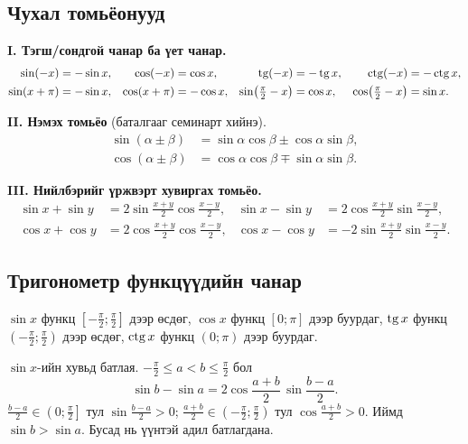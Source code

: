 \subsection{Чухал томьёонууд}
\textbf{I. Тэгш/сондгой чанар ба үет чанар.}
\begin{align*}
\sin(-x)&=-\sin x, & \cos(-x)&=\cos x, & \operatorname{tg}(-x)&=-\operatorname{tg} x, & \operatorname{ctg}(-x)&=-\operatorname{ctg} x,\\
\sin(x+\pi)&=-\sin x, & \cos(x+\pi)&=-\cos x, &
\sin\!\left(\tfrac{\pi}{2}-x\right)&=\cos x, & \cos\!\left(\tfrac{\pi}{2}-x\right)&=\sin x.
\end{align*}

\textbf{II. Нэмэх томьёо} (баталгааг семинарт хийнэ).
\begin{align*}
\sin(\alpha\pm\beta)&=\sin\alpha\cos\beta\pm\cos\alpha\sin\beta,\\
\cos(\alpha\pm\beta)&=\cos\alpha\cos\beta\mp\sin\alpha\sin\beta.
\end{align*}

\textbf{III. Нийлбэрийг үржвэрт хувиргах томьёо.}
\begin{align*}
\sin x+\sin y&=2\sin\frac{x+y}{2}\cos\frac{x-y}{2}, &
\sin x-\sin y&=2\cos\frac{x+y}{2}\sin\frac{x-y}{2},\\
\cos x+\cos y&=2\cos\frac{x+y}{2}\cos\frac{x-y}{2}, &
\cos x-\cos y&=-2\sin\frac{x+y}{2}\sin\frac{x-y}{2}.
\end{align*}

\subsection{Тригонометр функцүүдийн чанар}
\begin{theorem}
$\sin x$ функц $\left[-\frac{\pi}{2};\frac{\pi}{2}\right]$ дээр өсдөг,
$\cos x$ функц $[0;\pi]$ дээр буурдаг,
$\operatorname{tg} x$ функц $\left(-\frac{\pi}{2};\frac{\pi}{2}\right)$ дээр өсдөг,
$\operatorname{ctg} x$ функц $(0;\pi)$ дээр буурдаг.
\end{theorem}
\begin{prof}
$\sin x$-ийн хувьд батлая. $-\frac{\pi}{2}\le a<b\le\frac{\pi}{2}$ бол
\[
\sin b-\sin a=2\cos\frac{a+b}{2}\,\sin\frac{b-a}{2}.
\]
$\frac{b-a}{2}\in\left(0;\frac{\pi}{2}\right]$ тул $\sin\frac{b-a}{2}>0$;
$\frac{a+b}{2}\in\left(-\frac{\pi}{2};\frac{\pi}{2}\right)$ тул $\cos\frac{a+b}{2}>0$.
Иймд $\sin b>\sin a$. Бусад нь үүнтэй адил батлагдана.
\end{prof}

